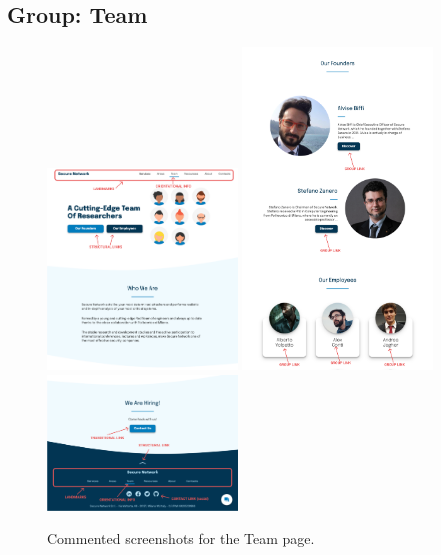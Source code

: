 \documentclass[12pt]{report}
\begin{document}
\subsection{Group: Team}

\begin{figure}[H]
	\centering
	\includegraphics[width=0.45\textwidth]{high_fid_wireframes/team/1.png}
	\includegraphics[width=0.45\textwidth]{high_fid_wireframes/team/2.png}
	\includegraphics[width=0.45\textwidth]{high_fid_wireframes/team/3.png}
	\caption{Commented screenshots for the Team page.}
\end{figure}
\end{document}
